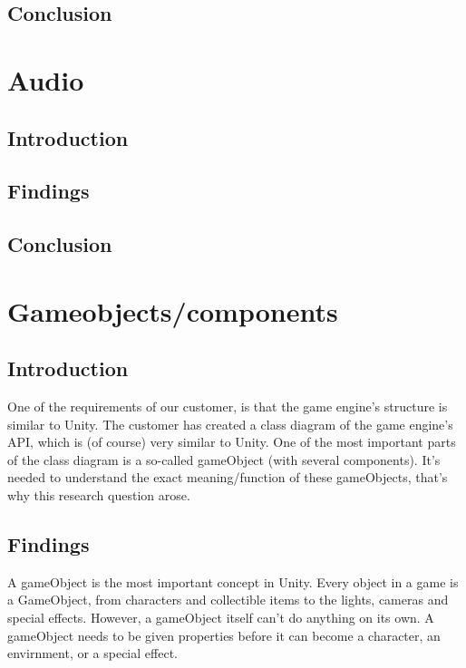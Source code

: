 \documentclass{projdoc}
\begin{document}
\subsection{Conclusion}

\section{Audio}

\subsection{Introduction}

\subsection{Findings}

\subsection{Conclusion}

\section{Gameobjects/components}
\label{sec:Gameobjects/components}

\subsection{Introduction}

One of the requirements of our customer, is that the game engine's structure is
similar to Unity. The customer has created a class diagram of the game engine's API,
which is (of course) very similar to Unity. One of the most important parts of the
class diagram is a so-called gameObject (with several components). It's needed to
understand the exact meaning/function of these gameObjects, that's why this research
question arose.

\subsection{Findings}

A gameObject is the most important concept in Unity. Every object in a game is a
GameObject, from characters and collectible items to the lights, cameras and special
effects. However, a gameObject itself can't do anything on its own. A gameObject
needs to be given properties before it can become a character, an envirnment, or a
special effect. \autocite{man:unityGameobjects}
\end{document}
